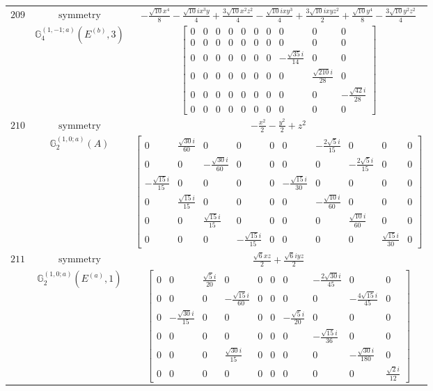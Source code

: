 \documentclass[fleqn,8pt,landscape]{jsarticle}
\begin{document}
\begin{longtable}{ccc}
$ 209 $ & $ \text{symmetry} $ & $ - \frac{\sqrt{10} x^{4}}{8} - \frac{\sqrt{10} i x^{3} y}{4} + \frac{3 \sqrt{10} x^{2} z^{2}}{4} - \frac{\sqrt{10} i x y^{3}}{4} + \frac{3 \sqrt{10} i x y z^{2}}{2} + \frac{\sqrt{10} y^{4}}{8} - \frac{3 \sqrt{10} y^{2} z^{2}}{4} $ \\
$  $ & $ \mathbb{G}_{4}^{(1,-1;a)}(E^{(b)},3) $ & $ \begin{bmatrix} 0 & 0 & 0 & 0 & 0 & 0 & 0 & 0 & 0 & 0 \\ 0 & 0 & 0 & 0 & 0 & 0 & 0 & 0 & 0 & 0 \\ 0 & 0 & 0 & 0 & 0 & 0 & 0 & - \frac{\sqrt{35} i}{14} & 0 & 0 \\ 0 & 0 & 0 & 0 & 0 & 0 & 0 & 0 & \frac{\sqrt{210} i}{28} & 0 \\ 0 & 0 & 0 & 0 & 0 & 0 & 0 & 0 & 0 & - \frac{\sqrt{42} i}{28} \\ 0 & 0 & 0 & 0 & 0 & 0 & 0 & 0 & 0 & 0 \end{bmatrix} $ \\ \hline
$ 210 $ & $ \text{symmetry} $ & $ - \frac{x^{2}}{2} - \frac{y^{2}}{2} + z^{2} $ \\
$  $ & $ \mathbb{G}_{2}^{(1,0;a)}(A) $ & $ \begin{bmatrix} 0 & \frac{\sqrt{30} i}{60} & 0 & 0 & 0 & 0 & - \frac{2 \sqrt{5} i}{15} & 0 & 0 & 0 \\ 0 & 0 & - \frac{\sqrt{30} i}{60} & 0 & 0 & 0 & 0 & - \frac{2 \sqrt{5} i}{15} & 0 & 0 \\ - \frac{\sqrt{15} i}{15} & 0 & 0 & 0 & 0 & - \frac{\sqrt{15} i}{30} & 0 & 0 & 0 & 0 \\ 0 & \frac{\sqrt{15} i}{15} & 0 & 0 & 0 & 0 & - \frac{\sqrt{10} i}{60} & 0 & 0 & 0 \\ 0 & 0 & \frac{\sqrt{15} i}{15} & 0 & 0 & 0 & 0 & \frac{\sqrt{10} i}{60} & 0 & 0 \\ 0 & 0 & 0 & - \frac{\sqrt{15} i}{15} & 0 & 0 & 0 & 0 & \frac{\sqrt{15} i}{30} & 0 \end{bmatrix} $ \\ \hline
$ 211 $ & $ \text{symmetry} $ & $ \frac{\sqrt{6} x z}{2} + \frac{\sqrt{6} i y z}{2} $ \\
$  $ & $ \mathbb{G}_{2}^{(1,0;a)}(E^{(a)},1) $ & $ \begin{bmatrix} 0 & 0 & \frac{\sqrt{5} i}{20} & 0 & 0 & 0 & 0 & - \frac{2 \sqrt{30} i}{45} & 0 & 0 \\ 0 & 0 & 0 & - \frac{\sqrt{15} i}{60} & 0 & 0 & 0 & 0 & - \frac{4 \sqrt{15} i}{45} & 0 \\ 0 & - \frac{\sqrt{30} i}{15} & 0 & 0 & 0 & 0 & - \frac{\sqrt{5} i}{20} & 0 & 0 & 0 \\ 0 & 0 & 0 & 0 & 0 & 0 & 0 & - \frac{\sqrt{15} i}{36} & 0 & 0 \\ 0 & 0 & 0 & \frac{\sqrt{30} i}{15} & 0 & 0 & 0 & 0 & - \frac{\sqrt{30} i}{180} & 0 \\ 0 & 0 & 0 & 0 & 0 & 0 & 0 & 0 & 0 & \frac{\sqrt{2} i}{12} \end{bmatrix} $ \\ \hline

\end{longtable}
\end{document}
